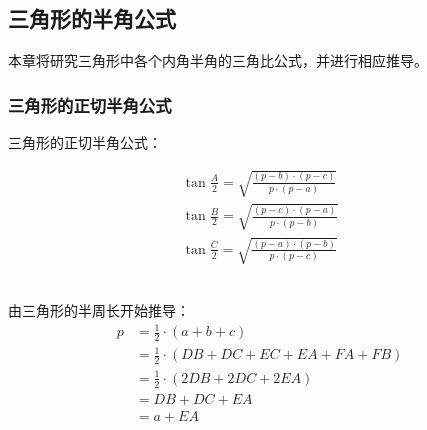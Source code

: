 \documentclass[UTF8]{ctexart}
\begin{document}
\subsection{三角形的半角公式}
    本章将研究三角形中各个内角半角的三角比公式，并进行相应推导。

\subsubsection{三角形的正切半角公式}
    三角形的正切半角公式：
    \begin{large}
        \begin{align*}
            \tan{\frac{A}{2}}=\sqrt{\frac{(p-b)\cdot(p-c)}{p\cdot(p-a)}}\\[3mm]
            \tan{\frac{B}{2}}=\sqrt{\frac{(p-c)\cdot(p-a)}{p\cdot(p-b)}}\\[3mm]
            \tan{\frac{C}{2}}=\sqrt{\frac{(p-a)\cdot(p-b)}{p\cdot(p-c)}}
        \end{align*}
    \end{large}\\
    由三角形的半周长开始推导：\vspace{3pt}
    \setcounter{equation}{0}
    \begin{align}
        p
        &=\frac{1}{2}\cdot(a+b+c)\\[3mm]
        &=\frac{1}{2}\cdot(DB+DC+EC+EA+FA+FB)\\[3mm]
        &=\frac{1}{2}\cdot(2DB+2DC+2EA)\\[3mm]
        &=DB+DC+EA\\[3mm]
        &=a+EA
    \end{align}
\end{document}
